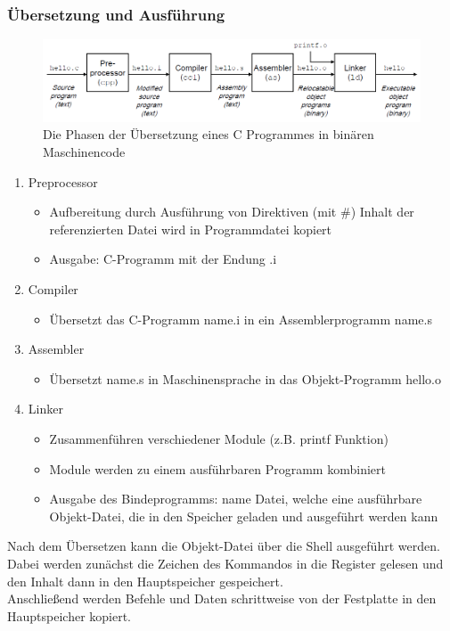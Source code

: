 \documentclass[a4paper,12pt,leqno]{article}
\begin{document}
\subsubsection{Übersetzung und Ausführung}
\begin{figure}
\centering
\includegraphics[scale=0.5]{Grafiken/Uebersetzungsprozess.png}
\caption{Die Phasen der Übersetzung eines C Programmes in binären Maschinencode}
\end{figure}

\begin{enumerate}
\item Preprocessor
	\begin{itemize}
	\item Aufbereitung durch Ausführung von Direktiven (mit \#) Inhalt der referenzierten Datei wird in Programmdatei kopiert
	\item Ausgabe: C-Programm mit der Endung .i
	\end{itemize}
\item Compiler
	\begin{itemize}
	\item Übersetzt das C-Programm name.i in ein Assemblerprogramm name.s
	\end{itemize}
\item Assembler
	\begin{itemize}
	\item Übersetzt name.s in Maschinensprache in das Objekt-Programm hello.o
	\end{itemize}
\item Linker
	\begin{itemize}
	\item Zusammenführen verschiedener Module (z.B. printf Funktion)
	\item Module werden zu einem ausführbaren Programm kombiniert
	\item Ausgabe des Bindeprogramms: name Datei, welche eine ausführbare Objekt-Datei, die in den Speicher geladen und ausgeführt werden kann
	\end{itemize}
\end{enumerate}

Nach dem Übersetzen kann die Objekt-Datei über die Shell ausgeführt werden. 
Dabei werden zunächst die Zeichen des Kommandos in die Register gelesen und den Inhalt dann in den Hauptspeicher gespeichert.\\
Anschließend werden Befehle und Daten schrittweise von der Festplatte in den Hauptspeicher kopiert.
\end{document}
